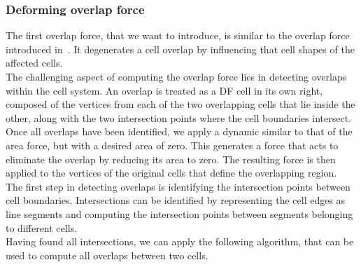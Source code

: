 \subsubsection*{Deforming overlap force}
The first overlap force, that we want to introduce, is similar to the overlap force introduced in~\cite{Vogel2023}. 
It degenerates a cell overlap by influencing that cell shapes of the affected cells. \\
The challenging aspect of computing the overlap force lies in detecting overlaps within the cell system. 
An overlap is treated as a DF cell in its own right, composed of the vertices from each of the two overlapping cells that lie inside the other, along with the two intersection points where the cell boundaries intersect. \\ 
Once all overlaps have been identified, we apply a dynamic similar to that of the area force, but with a desired area of zero. 
This generates a force that acts to eliminate the overlap by reducing its area to zero. 
The resulting force is then applied to the vertices of the original cells that define the overlapping region. \\
The first step in detecting overlaps is identifying the intersection points between cell boundaries.
Intersections can be identified by representing the cell edges as line segments and computing the intersection points between segments belonging to different cells. \\
Having found all intersections, we can apply the following algorithm, that can be used to compute all overlaps between two cells. 

